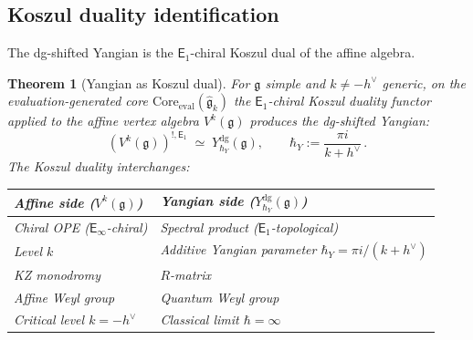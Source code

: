 \documentclass[11pt,reqno]{amsart}
\newtheorem{theorem}{Theorem}[section]
\theoremstyle{definition}
\theoremstyle{remark}
\newcommand{\Eone}{\mathsf{E}_{1}}
\newcommand{\Einf}{\mathsf{E}_{\infty}}
\newcommand{\fg}{\mathfrak{g}}
\newcommand{\Ydg}{Y^{\mathrm{dg}}}
\newcommand{\hv}{h^{\vee}}
\newcommand{\kp}{k + h^{\vee}}
\numberwithin{equation}{section}
\begin{document}
\subsection{Koszul duality identification}

The dg-shifted Yangian is the $\Eone$-chiral Koszul dual
of the affine algebra.

\begin{theorem}[Yangian as Koszul dual]
\label{thm:dk-yangian-koszul}
For $\fg$ simple and $k \neq -\hv$ generic, on the
evaluation-generated core
${\mathrm{Core}}_{\mathrm{eval}}(\widehat{\mathfrak{g}}_k)$
the $\Eone$-chiral Koszul duality functor applied to the
affine vertex algebra $V^k(\fg)$ produces the dg-shifted
Yangian:
\begin{equation}\label{eq:dk-koszul-yangian}
(V^k(\fg))^{!,\Eone}
\;\simeq\;
\Ydg_{\hbar_Y}(\fg),
\qquad
\hbar_Y := \frac{\pi i}{\kp}\,.
\end{equation}
The Koszul duality interchanges:
\begin{center}
\renewcommand{\arraystretch}{1.2}
\begin{tabular}{ll}
\toprule
\textbf{Affine side} ($V^k(\fg)$) &
\textbf{Yangian side} ($\Ydg_{\hbar_Y}(\fg)$) \\
\midrule
Chiral OPE ($\Einf$-chiral) &
Spectral product ($\Eone$-topological) \\
Level $k$ &
Additive Yangian parameter $\hbar_Y = \pi i/(\kp)$ \\
KZ monodromy &
$R$-matrix \\
Affine Weyl group &
Quantum Weyl group \\
Critical level $k = -\hv$ &
Classical limit $\hbar = \infty$ \\
\bottomrule
\end{tabular}
\end{center}
\end{theorem}
\end{document}
